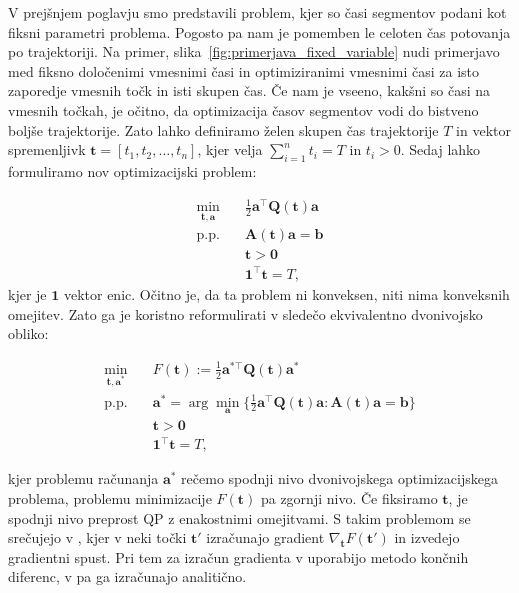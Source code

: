 \documentclass[mat2, tisk]{fmfdelo}
\begin{document}
V prejšnjem poglavju smo predstavili problem, kjer so časi segmentov podani kot fiksni parametri problema. Pogosto pa nam je pomemben le celoten čas potovanja po trajektoriji. Na primer, slika~\ref{fig:primerjava_fixed_variable} nudi primerjavo med fiksno določenimi vmesnimi časi in optimiziranimi vmesnimi časi za isto zaporedje vmesnih točk in isti skupen čas. Če nam je vseeno, kakšni so časi na vmesnih točkah, je očitno, da optimizacija časov segmentov vodi do bistveno boljše trajektorije. Zato lahko definiramo želen skupen čas trajektorije $T$ in vektor spremenljivk $\mathbf{t} = \left[ t_1, t_2, \ldots , t_n\right]$, kjer velja $\sum_{i=1}^n t_i = T$ in $t_i > 0$.  Sedaj lahko formuliramo nov optimizacijski problem:

\begin{equation}
    \begin{aligned}
        \min_{\mathbf{t},\mathbf{a}} & \quad \frac{1}{2}\mathbf{a}^\top \mathbf{Q}(\mathbf{t}) \mathbf{a}\\
        \text{p.p.} & \quad \mathbf{A}(\mathbf{t})\mathbf{a} = \mathbf{b}\\
        & \quad \mathbf{t} > \mathbf{0} \\
        & \quad \mathbf{1}^\top \mathbf{t} = T,
    \end{aligned}
\end{equation}
kjer je $\mathbf{1}$ vektor enic. Očitno je, da ta problem ni konveksen, niti nima konveksnih omejitev. Zato ga je koristno reformulirati v sledečo ekvivalentno dvonivojsko obliko:

\begin{equation}
    \begin{aligned}
        \min_{\mathbf{t},\mathbf{a^*}}& \quad F(\mathbf{t}) := \frac{1}{2}\mathbf{a^{*\top}}\mathbf{Q}(\mathbf{t})\mathbf{a^*} \\
        \text{p.p.}& \quad\mathbf{a^*} = \arg \min_\mathbf{a} \{\frac{1}{2}\mathbf{a}^\top\mathbf{Q}(\mathbf{t})\mathbf{a} : \mathbf{A}(\mathbf{t})\mathbf{a} = \mathbf{b}\}\\
        & \quad \mathbf{t} > \mathbf{0} \\
        & \quad \mathbf{1}^\top \mathbf{t} = T,
    \end{aligned}
\end{equation}

kjer problemu računanja $\mathbf{a}^*$ rečemo spodnji nivo dvonivojskega optimizacijskega problema, problemu minimizacije $F(\mathbf{t})$ pa zgornji nivo. Če fiksiramo $\mathbf{t}$, je spodnji nivo preprost QP z enakostnimi omejitvami. S takim problemom se srečujejo v \cite{mellinger2011minimum, sun2021fast}, kjer v neki točki $\mathbf{t}'$ izračunajo gradient $\nabla_\mathbf{t}F(\mathbf{t}')$ in izvedejo gradientni spust. Pri tem za izračun gradienta v \cite{mellinger2011minimum} uporabijo metodo končnih diferenc, v \cite{sun2021fast} pa ga izračunajo analitično.
\end{document}
